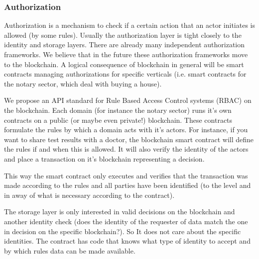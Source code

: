 \documentclass{article}
\begin{document}
\subsubsection{Authorization}
Authorization is a mechanism to check if a certain action that an actor initiates is allowed (by some rules). Usually the authorization layer is tight closely to the identity and storage layers. There are already many independent authorization frameworks. We believe that in the future these authorization frameworks move to the blockchain. A logical consequence of blockchain in general will be smart contracts managing authorizations for specific verticals (i.e. smart contracts for the notary sector, which deal with buying a house).

We propose an API standard for Rule Based Access Control systems (RBAC) on the blockchain. Each domain (for instance the notary sector) runs it's own contracts on a public (or maybe even private!) blockchain. These contracts formulate the rules by which a domain acts with it's actors. For instance, if you want to share test results with a doctor, the blockchain smart contract will define the rules if and when this is allowed. It will also verify the identity of the actors and place a transaction on it's blockchain representing a decision.

This way the smart contract only executes and verifies that the transaction was made according to the rules and all parties have been identified (to the level and in away of what is necessary according to the contract).

The storage layer is only interested in valid decisions on the blockchain and another identity check (does the identity of the requester of data match the one in decision on the specific blockchain?). So It does not care about the specific identities. The contract has code that knows what type of identity to accept and by which rules data can be made available.
\end{document}
